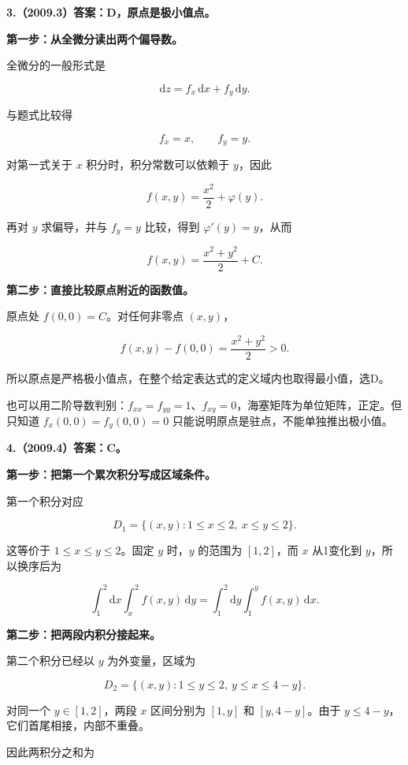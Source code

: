 \documentclass[UTF8,11pt,fontset=windows]{ctexart}
\begin{document}
\clearpage

\textbf{3.（2009.3）答案：D，原点是极小值点。}

\textbf{第一步：从全微分读出两个偏导数。}

全微分的一般形式是

$$
\mathrm dz=f_x\,\mathrm dx+f_y\,\mathrm dy.
$$

与题式比较得

$$
f_x=x,\qquad f_y=y.
$$

对第一式关于 $x$ 积分时，积分常数可以依赖于 $y$，因此

$$
f(x,y)=\frac{x^2}{2}+\varphi(y).
$$

再对 $y$ 求偏导，并与 $f_y=y$ 比较，得到 $\varphi'(y)=y$，从而

$$
f(x,y)=\frac{x^2+y^2}{2}+C.
$$

\textbf{第二步：直接比较原点附近的函数值。}

原点处 $f(0,0)=C$。对任何非零点 $(x,y)$，

$$
f(x,y)-f(0,0)=\frac{x^2+y^2}{2}>0.
$$

所以原点是严格极小值点，在整个给定表达式的定义域内也取得最小值，选D。

也可以用二阶导数判别：$f_{xx}=f_{yy}=1$、$f_{xy}=0$，海塞矩阵为单位矩阵，正定。但只知道 $f_x(0,0)=f_y(0,0)=0$ 只能说明原点是驻点，不能单独推出极小值。

\clearpage

\textbf{4.（2009.4）答案：C。}

\textbf{第一步：把第一个累次积分写成区域条件。}

第一个积分对应

$$
D_1=\{(x,y):1\le x\le2,\ x\le y\le2\}.
$$

这等价于 $1\le x\le y\le2$。固定 $y$ 时，$y$ 的范围为 $[1,2]$，而 $x$ 从1变化到 $y$，所以换序后为

$$
\int_1^2\mathrm dx\int_x^2f(x,y)\,\mathrm dy
=\int_1^2\mathrm dy\int_1^y f(x,y)\,\mathrm dx.
$$

\textbf{第二步：把两段内积分接起来。}

第二个积分已经以 $y$ 为外变量，区域为

$$
D_2=\{(x,y):1\le y\le2,\ y\le x\le4-y\}.
$$

对同一个 $y\in[1,2]$，两段 $x$ 区间分别为 $[1,y]$ 和 $[y,4-y]$。由于 $y\le4-y$，它们首尾相接，内部不重叠。

因此两积分之和为
\end{document}
